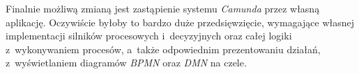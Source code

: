 Finalnie możliwą zmianą jest zastąpienie systemu \emph{Camunda} przez własną aplikację. Oczywiście byłoby to bardzo duże przedsięwzięcie, wymagające własnej implementacji silników procesowych i~decyzyjnych oraz całej logiki z~wykonywaniem procesów, a~także odpowiednim prezentowaniu działań, z~wyświetlaniem diagramów \emph{BPMN} oraz \emph{DMN} na czele.